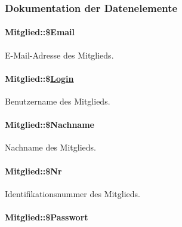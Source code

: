 \subsubsection{Dokumentation der Datenelemente}
\hypertarget{classMitglied_4be6b837c482ac912188663380d31122}{
\paragraph[\$Email]{\setlength{\rightskip}{0pt plus 5cm}Mitglied::\$Email}\hfill}
\label{classMitglied_4be6b837c482ac912188663380d31122}


E-Mail-Adresse des Mitglieds. 

\hypertarget{classMitglied_626ee2f2551cc2840bdeac6a04491b2e}{
\paragraph[\$Login]{\setlength{\rightskip}{0pt plus 5cm}Mitglied::\$\hyperlink{classLogin}{Login}}\hfill}
\label{classMitglied_626ee2f2551cc2840bdeac6a04491b2e}


Benutzername des Mitglieds. 

\hypertarget{classMitglied_635def9ec266748689397299c7f79d9c}{
\paragraph[\$Nachname]{\setlength{\rightskip}{0pt plus 5cm}Mitglied::\$Nachname}\hfill}
\label{classMitglied_635def9ec266748689397299c7f79d9c}


Nachname des Mitglieds. 

\hypertarget{classMitglied_113efe44273361b7c167c729666ad04c}{
\paragraph[\$Nr]{\setlength{\rightskip}{0pt plus 5cm}Mitglied::\$Nr}\hfill}
\label{classMitglied_113efe44273361b7c167c729666ad04c}


Identifikationsnummer des Mitglieds. 

\hypertarget{classMitglied_94f43b65c468ad42ac45be064d015446}{
\paragraph[\$Passwort]{\setlength{\rightskip}{0pt plus 5cm}Mitglied::\$Passwort}\hfill}
\label{classMitglied_94f43b65c468ad42ac45be064d015446}


